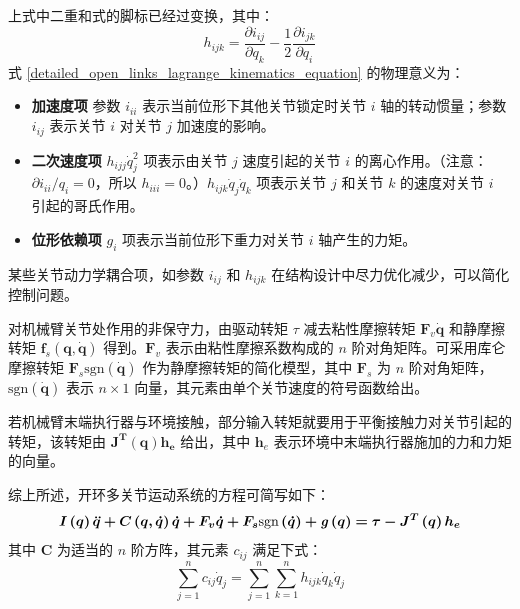 \documentclass[cn,11pt,chinese,blue,bibstyle=ieeetr]{elegantbook}
\begin{document}
上式中二重和式的脚标已经过变换，其中：
\begin{equation}\label{quadratic_velocity_terms_1}
h_{ijk} = \frac{\partial i_{ij}}{\partial q_k} - \frac{1}{2}  \frac{\partial i_{jk}}{\partial q_i}
\end{equation}
式 \ref{detailed_open_links_lagrange_kinematics_equation} 的物理意义为：
\begin{itemize}
	\item \textbf{加速度项} 参数 $i_{ii}$ 表示当前位形下其他关节锁定时关节 $i$ 轴的转动惯量；参数 $i_{ij}$ 表示关节 $i$ 对关节 $j$ 加速度的影响。
	\item \textbf{二次速度项} $h_{ijj} \dot{q}_j^2$ 项表示由关节 $j$ 速度引起的关节 $i$ 的离心作用。（注意：${\partial i_{ii}}/{q_i} = 0$，所以 $h_{iii} = 0$。）$h_{ijk} \dot{q}_j \dot{q}_k$ 项表示关节 $j$ 和关节 $k$ 的速度对关节 $i$ 引起的哥氏作用。
	\item \textbf{位形依赖项} $\textit{g}_i$ 项表示当前位形下重力对关节 $i$ 轴产生的力矩。
\end{itemize}

某些关节动力学耦合项，如参数 $i_{ij}$ 和 $h_{ijk}$ 在结构设计中尽力优化减少，可以简化控制问题。

对机械臂关节处作用的非保守力，由驱动转矩 $\tau$ 减去粘性摩擦转矩 $\bm{F}_v \bm{\dot q}$ 和静摩擦转矩 $\bm{f}_s (\bm{q}, \bm{\dot q})$ 得到。$\bm{F}_v$ 表示由粘性摩擦系数构成的 $n$ 阶对角矩阵。可采用库仑摩擦转矩 $\bm{F}_s \text{sgn}(\bm{\dot q})$ 作为静摩擦转矩的简化模型，其中 $\bm{F}_s$ 为 $n$ 阶对角矩阵，$\text{sgn}(\bm{\dot q})$ 表示 $n \times 1$ 向量，其元素由单个关节速度的符号函数给出。

若机械臂末端执行器与环境接触，部分输入转矩就要用于平衡接触力对关节引起的转矩，该转矩由 $\bm{{J}^T \left(q\right) {h}_e}$ 给出，其中 $\bm{h}_e$ 表示环境中末端执行器施加的力和力矩的向量。

综上所述，开环多关节运动系统的方程可简写如下：
\begin{equation}\label{brief_open_links_lagrange_kinematics_equation}
\bm{\bm{I}\left(q\right)\ddot{q} + C\left(q, \dot{q}\right)\dot{q} + F_v\dot{q} + F_s \text{sgn}\left(\dot{q}\right) + \textbf{\textit{g}}\left(q\right) = \tau - J^T\left(q\right)h_e}
\end{equation}
其中 $\bm C$ 为适当的 $n$ 阶方阵，其元素 $c_{ij}$ 满足下式：
\begin{equation}\label{quadratic_velocity_terms_2}
\sum_{j=1}^{n} {c_{ij}\dot{q}_{j}} = \sum_{j=1}^{n} \sum_{k=1}^{n} {h_{ijk}\dot{q}_k\dot{q}_j}
\end{equation}
\end{document}
